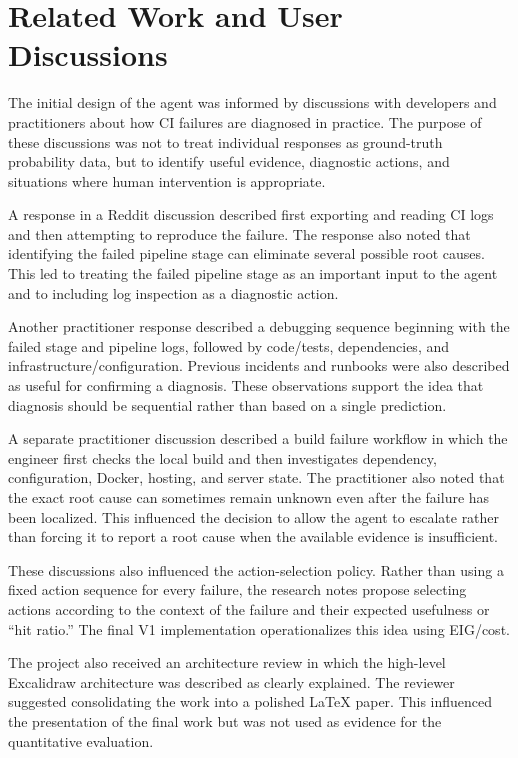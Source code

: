 \documentclass{article}
\begin{document}
\section{Related Work and User Discussions}

The initial design of the agent was informed by discussions with developers and practitioners about how CI failures are diagnosed in practice. The purpose of these discussions was not to treat individual responses as ground-truth probability data, but to identify useful evidence, diagnostic actions, and situations where human intervention is appropriate.

A response in a Reddit discussion described first exporting and reading CI logs and then attempting to reproduce the failure. The response also noted that identifying the failed pipeline stage can eliminate several possible root causes. This led to treating the failed pipeline stage as an important input to the agent and to including log inspection as a diagnostic action.

Another practitioner response described a debugging sequence beginning with the failed stage and pipeline logs, followed by code/tests, dependencies, and infrastructure/configuration. Previous incidents and runbooks were also described as useful for confirming a diagnosis. These observations support the idea that diagnosis should be sequential rather than based on a single prediction.

A separate practitioner discussion described a build failure workflow in which the engineer first checks the local build and then investigates dependency, configuration, Docker, hosting, and server state. The practitioner also noted that the exact root cause can sometimes remain unknown even after the failure has been localized. This influenced the decision to allow the agent to escalate rather than forcing it to report a root cause when the available evidence is insufficient.

These discussions also influenced the action-selection policy. Rather than using a fixed action sequence for every failure, the research notes propose selecting actions according to the context of the failure and their expected usefulness or ``hit ratio.'' The final V1 implementation operationalizes this idea using EIG/cost.

The project also received an architecture review in which the high-level Excalidraw architecture was described as clearly explained. The reviewer suggested consolidating the work into a polished LaTeX paper. This influenced the presentation of the final work but was not used as evidence for the quantitative evaluation.
\end{document}
